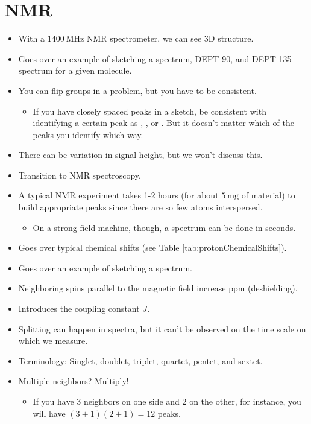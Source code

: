 \documentclass[../notes.tex]{subfiles}
\begin{document}
\section{NMR}
\begin{itemize}
    \item {}With a $\SI{1400}{\mega\hertz}$ NMR spectrometer, we can see 3D structure.
    \item Goes over an example of sketching a  spectrum, DEPT 90, and DEPT 135 spectrum for a given molecule.
    \item You can flip groups in a problem, but you have to be consistent.
    \begin{itemize}
        \item If you have closely spaced peaks in a sketch, be consistent with identifying a certain peak as , , or . But it doesn't matter which of the peaks you identify which way.
    \end{itemize}
    \item There can be variation in signal height, but we won't discuss this.
    \item Transition to  NMR spectroscopy.
    \item A typical  NMR experiment takes 1-2 hours (for about $\SI{5}{\milli\gram}$ of material) to build appropriate peaks since there are so few  atoms interspersed.
    \begin{itemize}
        \item On a strong field machine, though, a  spectrum can be done in seconds.
    \end{itemize}
    \item Goes over typical chemical shifts (see Table \ref{tab:protonChemicalShifts}).
    \item Goes over an example of sketching a  spectrum.
    \item Neighboring spins parallel to the magnetic field increase ppm (deshielding).
    \item Introduces the coupling constant $J$.
    \item Splitting can happen in  spectra, but it can't be observed on the time scale on which we measure.
    \item Terminology: Singlet, doublet, triplet, quartet, pentet, and sextet.
    \item Multiple neighbors? Multiply!
    \begin{itemize}
        \item If you have 3 neighbors on one side and 2 on the other, for instance, you will have $(3+1)(2+1)=12$ peaks.

\end{itemize}
\end{itemize}
\end{document}
